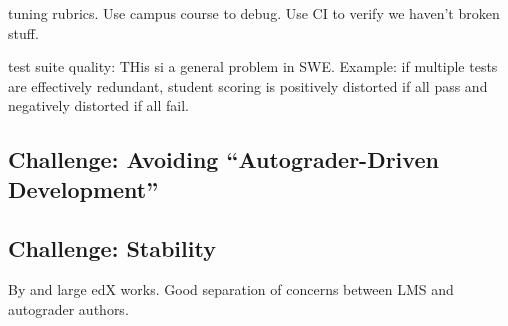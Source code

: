 tuning rubrics. Use campus course to debug. Use CI to
verify we haven't broken stuff.

test suite quality: THis si a general problem in SWE. Example: if multiple tests are effectively redundant, student scoring is positively distorted if all pass and negatively distorted if all fail.


\subsection{Challenge: Avoiding ``Autograder-Driven Development''}

\subsection{Challenge: Stability}

By and large edX works.  Good separation
of concerns between LMS and autograder authors.




